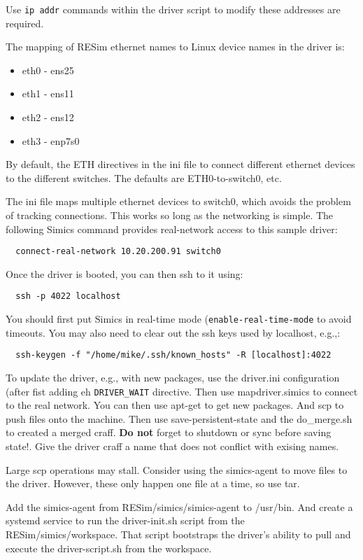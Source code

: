 \documentclass[titlepage]{article}
\begin{document}
\begin{appendices}
Use {\tt ip addr} commands within the driver script to modify these addresses are required.

The mapping of RESim ethernet names to Linux device names in the driver is: 

\begin{itemize}
\item eth0 - ens25
\item eth1 - ens11
\item eth2 - ens12
\item eth3 - enp7s0
\end{itemize}

By default, the ETH directives in the ini file to connect different ethernet devices to the
different switches.  The defaults are ETH0-to-switch0, etc.

The ini file maps multiple ethernet devices to switch0, which avoids the problem of
tracking connections.  This works so long as the networking is simple.
The following Simics command provides real-network access to this sample driver:
\begin{verbatim}
  connect-real-network 10.20.200.91 switch0
\end{verbatim}
Once the driver is booted, you can then ssh to it using:
\begin{verbatim}
  ssh -p 4022 localhost
\end{verbatim}
You should first put Simics in real-time mode ({\tt enable-real-time-mode} to avoid timeouts.  You may also need to clear out the
ssh keys used by localhost, e.g.,:
\begin{verbatim}
  ssh-keygen -f "/home/mike/.ssh/known_hosts" -R [localhost]:4022
\end{verbatim}


To update the driver, e.g., with new packages, use the driver.ini configuration (after fist adding eh {\tt DRIVER\_WAIT} directive.  Then use mapdriver.simics to connect to the real network.
You can then use apt-get to get new packages.  And scp to push files onto the machine.  Then use save-persistent-state and the do\_merge.sh to
created a merged craff.  \textbf{Do not} forget to shutdown or sync before saving state!.  Give the driver craff a name that does not conflict with exising names.

Large scp operations may stall.  Consider using the simics-agent to move files to the driver.  However,
these only happen one file at a time, so use tar.

Add the simics-agent from RESim/simics/simics-agent to /usr/bin.  And create a systemd service to run the
driver-init.sh script from the RESim/simics/workspace.  That script bootstraps the driver's ability to pull
and execute the driver-script.sh from the workspace.


\end{appendices}
\end{document}
